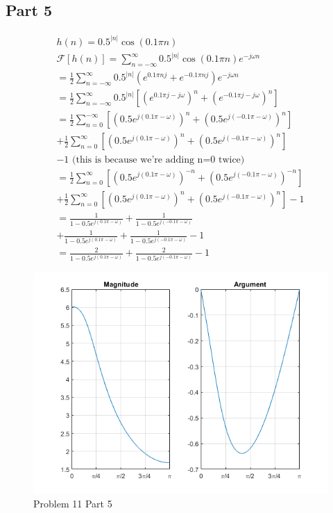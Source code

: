\documentclass{article}
\begin{document}
\subsection*{Part 5}
\begin{gather*}
    h(n) = 0.5^{|n|}\cos(0.1\pi n)\\
    \mathcal{F}[h(n)] = \sum_{n=-\infty}^\infty 0.5^{|n|}\cos(0.1\pi n) e^{-j\omega n}\\
    =\frac12 \sum_{n=-\infty}^\infty 0.5^{|n|} \left(e^{0.1\pi n j} + e^{-0.1\pi n j}\right)e^{-j\omega n}\\
    =\frac12 \sum_{n=-\infty}^\infty 0.5^{|n|} \left[ \left(e^{0.1\pi j - j\omega}\right)^n + \left( e^{-0.1\pi j - j\omega} \right)^n \right]\\
    =\frac12 \sum_{n=0}^{-\infty} \left[\left(0.5e^{j\left(0.1\pi  - \omega\right)}\right)^n + \left(0.5e^{j\left(-0.1\pi  - \omega\right)}\right)^n \right]\\
    +\frac12 \sum_{n=0}^{ \infty} \left[\left(0.5e^{j\left(0.1\pi  - \omega\right)}\right)^n + \left(0.5e^{j\left(-0.1\pi  - \omega\right)}\right)^n \right]\\
    - 1 \text{ (this is because we're adding n=0 twice)}\\
    =\frac12 \sum_{n=0}^{\infty} \left[\left(0.5e^{j\left(0.1\pi  - \omega\right)}\right)^{-n} + \left(0.5e^{j\left(-0.1\pi  - \omega\right)}\right)^{-n} \right]\\
    +\frac12 \sum_{n=0}^{ \infty} \left[\left(0.5e^{j\left(0.1\pi  - \omega\right)}\right)^n + \left(0.5e^{j\left(-0.1\pi  - \omega\right)}\right)^n \right]
    - 1\\
    = \frac{1}{1-0.5e^{j\left(0.1\pi  - \omega\right)}} + \frac{1}{1-0.5e^{j\left(-0.1\pi  - \omega\right)}}\\
    + \frac{1}{1-0.5e^{j\left(0.1\pi  - \omega\right)}} + \frac{1}{1-0.5e^{j\left(-0.1\pi  - \omega\right)}} - 1\\
    = \frac{2}{1-0.5e^{j\left(0.1\pi  - \omega\right)}} + \frac{2}{1-0.5e^{j\left(-0.1\pi  - \omega\right)}} - 1
\end{gather*}
\begin{figure}[H]
    \centering
    \includegraphics[width=\textwidth]{html/Homework3_17.png}
    \caption{Problem 11 Part 5}
    \label{3.11.5}
\end{figure}
\end{document}
